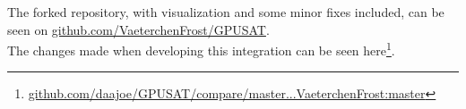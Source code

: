 \documentclass[a4paper, 12pt, bibliography=totoc]{scrartcl}
\begin{document}
The forked repository, with visualization and some minor fixes included, can be seen on \url{github.com/VaeterchenFrost/GPUSAT}. \\
The changes made when developing this integration can be seen here\footnote{\url{github.com/daajoe/GPUSAT/compare/master...VaeterchenFrost:master}}.

\end{document}
